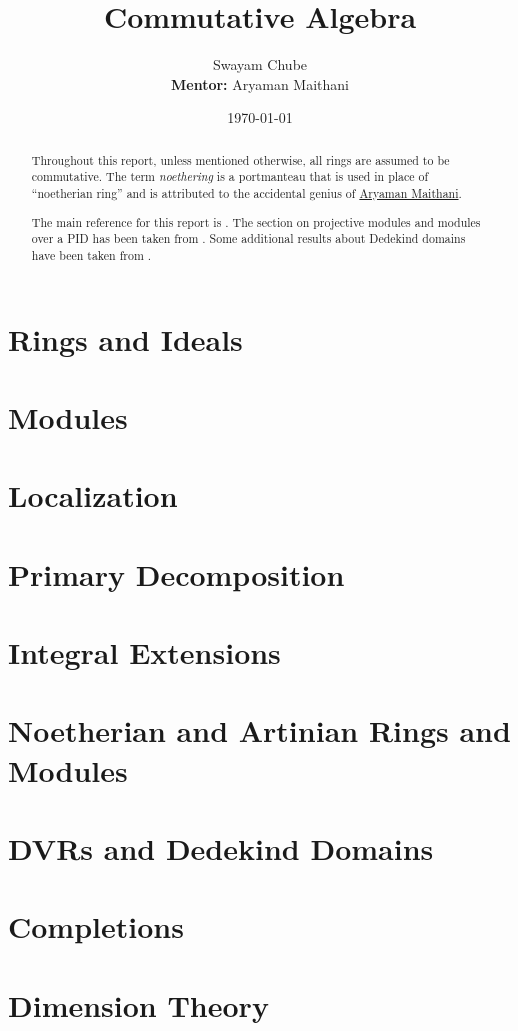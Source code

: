 \documentclass[oneside]{report}
\title{Commutative Algebra}
\author{Swayam Chube\\\textbf{Mentor:} Aryaman Maithani}
\date{\today}
\begin{document}
\maketitle

\begin{abstract}
    Throughout this report, unless mentioned otherwise, all rings are assumed to be commutative. The term \textit{noethering} is a portmanteau that is used in place of ``noetherian ring'' and is attributed to the accidental genius of \href{https://www.youtube.com/live/RrjJfyEF7Ak?feature=share&t=102}{Aryaman Maithani}.

    The main reference for this report is \cite{AM69}. The section on projective modules and modules over a PID has been taken from \cite{Lan02}. Some additional results about Dedekind domains have been taken from \cite{milne-algnt}.
\end{abstract}

\tableofcontents

\chapter{Rings and Ideals}


\chapter{Modules}


\chapter{Localization}


\chapter{Primary Decomposition}


\chapter{Integral Extensions}


\chapter{Noetherian and Artinian Rings and Modules}


\chapter{DVRs and Dedekind Domains}


\chapter{Completions}


\chapter{Dimension Theory}




\end{document}
